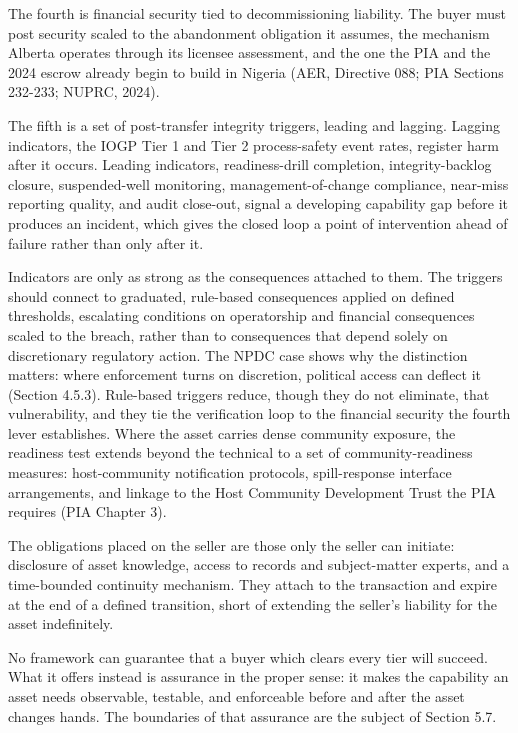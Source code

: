 The fourth is financial security tied to decommissioning liability. The
buyer must post security scaled to the abandonment obligation it
assumes, the mechanism Alberta operates through its licensee assessment,
and the one the PIA and the 2024 escrow already begin to build in
Nigeria (AER, Directive 088; PIA Sections 232-233; NUPRC, 2024).

The fifth is a set of post-transfer integrity triggers, leading and
lagging. Lagging indicators, the IOGP Tier 1 and Tier 2 process-safety
event rates, register harm after it occurs. Leading indicators,
readiness-drill completion, integrity-backlog closure, suspended-well
monitoring, management-of-change compliance, near-miss reporting
quality, and audit close-out, signal a developing capability gap before
it produces an incident, which gives the closed loop a point of
intervention ahead of failure rather than only after it.

Indicators are only as strong as the consequences attached to them. The
triggers should connect to graduated, rule-based consequences applied on
defined thresholds, escalating conditions on operatorship and financial
consequences scaled to the breach, rather than to consequences that
depend solely on discretionary regulatory action. The NPDC case shows
why the distinction matters: where enforcement turns on discretion,
political access can deflect it (Section 4.5.3). Rule-based triggers
reduce, though they do not eliminate, that vulnerability, and they tie
the verification loop to the financial security the fourth lever
establishes. Where the asset carries dense community exposure, the
readiness test extends beyond the technical to a set of
community-readiness measures: host-community notification protocols,
spill-response interface arrangements, and linkage to the Host Community
Development Trust the PIA requires (PIA Chapter 3).

The obligations placed on the seller are those only the seller can
initiate: disclosure of asset knowledge, access to records and
subject-matter experts, and a time-bounded continuity mechanism. They
attach to the transaction and expire at the end of a defined transition,
short of extending the seller's liability for the asset indefinitely.

No framework can guarantee that a buyer which clears every tier will
succeed. What it offers instead is assurance in the proper sense: it
makes the capability an asset needs observable, testable, and
enforceable before and after the asset changes hands. The boundaries of
that assurance are the subject of Section 5.7.

